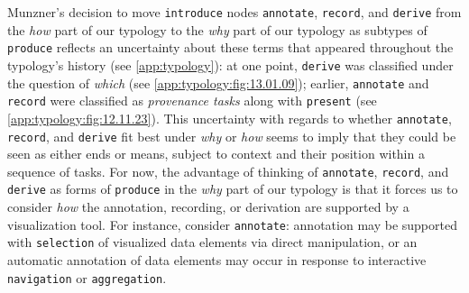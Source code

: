 Munzner's decision to move {\tt introduce} nodes {\tt annotate}, {\tt record}, and {\tt derive} from the {\it how} part of our typology to the {\it why} part of our typology as subtypes of {\tt produce} reflects an uncertainty about these terms that appeared throughout the typology's history (see \autoref{app:typology}): at one point, {\tt derive} was classified under the question of {\it which} (see \autoref{app:typology:fig:13.01.09}); earlier, {\tt annotate} and {\tt record} were classified as {\it provenance tasks} along with {\tt present} (see \autoref{app:typology:fig:12.11.23}).
This uncertainty with regards to whether {\tt annotate}, {\tt record}, and {\tt derive} fit best under {\it why} or {\it how} seems to imply that they could be seen as either ends or means, subject to context and their position within a sequence of tasks. 
For now, the advantage of thinking of {\tt annotate}, {\tt record}, and {\tt derive} as forms of {\tt produce} in the {\it why} part of our typology is that it forces us to consider {\it how} the annotation, recording, or derivation are supported by a visualization tool.
For instance, consider {\tt annotate}: annotation may be supported with {\tt selection} of visualized data elements via direct manipulation, or an automatic annotation of data elements may occur in response to interactive {\tt navigation} or {\tt aggregation}.

